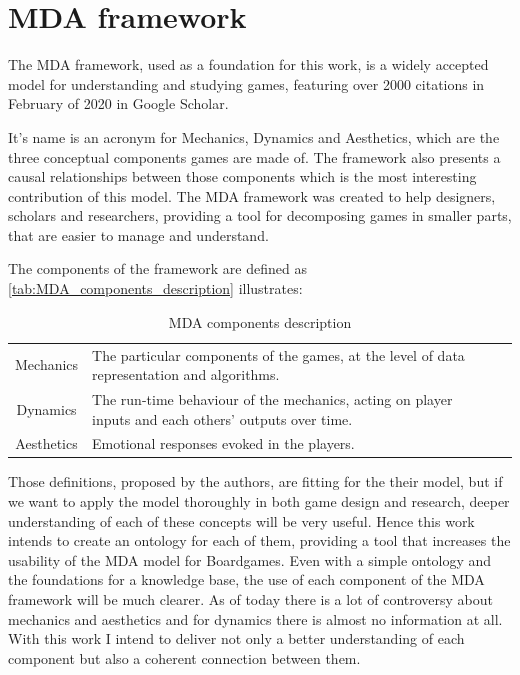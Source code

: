 \section{MDA framework}

The MDA framework, used as a foundation for this work, is a widely accepted model for understanding and studying games, featuring over 2000 citations in February of 2020 in Google Scholar. 

It's name is an acronym for Mechanics, Dynamics and Aesthetics, which are the three conceptual components games are made of. The framework also presents a causal relationships between those components which is the most interesting contribution of this model. The MDA framework was created to help designers, scholars and researchers, providing a tool for decomposing games in smaller parts, that are easier to manage and understand. 

The components of the framework are defined as \autoref{tab:MDA_components_description} illustrates:
{\renewcommand{\arraystretch}{1.5}
\begin{table}[!h]
    \caption{MDA components description \citep{Hunicke2004}}
    \vspace{.5em}
    \centering
    \begin{tabular}{c|m{6cm}l|}
    Mechanics &  The particular components of the games, at the level of data representation and algorithms.\\ \cline{1-2}
    Dynamics & The run-time behaviour of the mechanics, acting on player inputs and each others' outputs over time.\\ \cline{1-2} 
    Aesthetics & Emotional responses evoked in the players.\\
    \end{tabular}
    \label{tab:MDA_components_description}
\end{table}}


Those definitions, proposed by the authors, are fitting for the their model, but if we want to apply the model thoroughly in both game design and research, deeper understanding of each of these concepts will be very useful. Hence this work intends to create an ontology for each of them, providing a tool that increases the usability of the MDA model for Boardgames. Even with a simple ontology and the foundations for a knowledge base, the use of each component of the MDA framework will be much clearer. As of today there is a lot of controversy about mechanics and aesthetics and for dynamics there is almost no information at all. With this work I intend to deliver not only a better  understanding of each component but also a coherent connection between them. 

